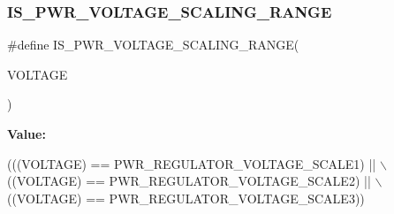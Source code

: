 \subsubsection{\texorpdfstring{I\+S\+\_\+\+P\+W\+R\+\_\+\+V\+O\+L\+T\+A\+G\+E\+\_\+\+S\+C\+A\+L\+I\+N\+G\+\_\+\+R\+A\+N\+GE}{IS\_PWR\_VOLTAGE\_SCALING\_RANGE}}
{\footnotesize\ttfamily \#define I\+S\+\_\+\+P\+W\+R\+\_\+\+V\+O\+L\+T\+A\+G\+E\+\_\+\+S\+C\+A\+L\+I\+N\+G\+\_\+\+R\+A\+N\+GE(\begin{DoxyParamCaption}\item[{}]{V\+O\+L\+T\+A\+GE }\end{DoxyParamCaption})}

{\bfseries Value\+:}
\begin{DoxyCode}
(((VOLTAGE) == PWR\_REGULATOR\_VOLTAGE\_SCALE1) || \(\backslash\)
                                               ((VOLTAGE) == PWR\_REGULATOR\_VOLTAGE\_SCALE2) || \(\backslash\)
                                               ((VOLTAGE) == PWR\_REGULATOR\_VOLTAGE\_SCALE3))
\end{DoxyCode}

